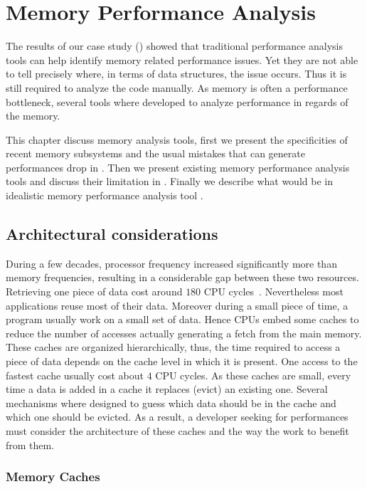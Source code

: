 \chapter{Memory Performance Analysis}

The results of our case study () showed that traditional performance analysis tools can help identify memory related performance issues.
Yet they are not able to tell precisely where, in terms of data structures, the issue occurs.
Thus it is still required to analyze the code manually.
As memory is often a performance bottleneck, several tools where developed to analyze performance in regards of the memory.

This chapter discuss memory analysis tools, first we present the specificities of recent memory subsystems and the usual mistakes that can generate performances drop in .
Then we present existing memory performance analysis tools and discuss their limitation in .
Finally we describe what would be in idealistic memory performance analysis tool .

\section{Architectural considerations}
\label{sec:archi}

During a few decades, processor frequency increased significantly more than memory frequencies, resulting in a considerable gap between these two resources.
Retrieving one piece of data cost around $180$ \gls{CPU} cycles~\cite{Levinthal09Performance}.
Nevertheless most applications reuse most of their data.
Moreover during a small piece of time, a program usually work on a small set of data.
Hence \glspl{CPU} embed some caches to reduce the number of accesses actually generating a fetch from the main memory.
These caches are organized hierarchically, thus, the time required to access a piece of data depends on the cache level in which it is present.
One access to the fastest cache usually cost about $4$ \gls{CPU} cycles.
As these caches are small, every time a data is added in a cache it replaces (evict) an existing one.
Several mechanisms where designed to guess which data should be in the cache and which one should be evicted.
As a result, a developer seeking for performances must consider the architecture of these caches and the way the work to benefit from them.

\subsection{Memory Caches}

